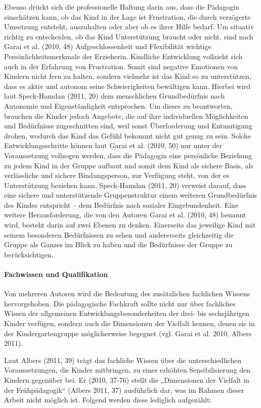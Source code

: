 Ebenso drückt sich die professionelle Haltung darin aus, dass die Pädagogin einschätzen kann, ob das Kind in der Lage ist Frustration, die durch verzögerte Umsetzung entsteht, auszuhalten oder aber ob es ihrer Hilfe bedarf. Um situativ richtig zu entscheiden, ob das Kind Unterstützung braucht oder nicht, sind nach Garai et al. (2010, 48) Aufgeschlossenheit und Flexibilität wichtige Persönlichkeitsmerkmale der Erzieherin. Kindliche Entwicklung vollzieht sich auch in der Erfahrung von Frustration. Somit sind negative Emotionen von Kindern nicht fern zu halten, sondern vielmehr ist das Kind so zu unterstützen, dass es aktiv und autonom seine Schwierigkeiten bewältigen kann.
Hierbei wird laut Speck-Hamdan (2011, 20) dem menschlichen Grundbedürfnis nach Autonomie und Eigenständigkeit entsprochen. Um dieses zu beantworten, brauchen die Kinder jedoch Angebote, die auf ihre individuellen Möglichkeiten und Bedürfnisse zugeschnitten sind, weil sonst Überforderung und Entmutigung drohen, wodurch das Kind das Gefühl bekommt nicht gut genug zu sein. Solche Entwicklungsschritte können laut Garai et al. (2010, 50) nur unter der Voraussetzung vollzogen werden, dass die Pädagogin eine persönliche Beziehung zu jedem Kind in der Gruppe aufbaut und somit dem Kind als sichere Basis, als verlässliche und sichere Bindungsperson, zur Verfügung steht, von der es Unterstützung beziehen kann. Speck-Hamdan (2011, 20) verweist darauf, dass eine sichere und unterstützende Gruppenstruktur einem weiteren Grundbedürfnis des Kindes entspricht -- dem Bedürfnis nach sozialer Eingebundenheit. 
Eine weitere Herausforderung, die von den Autoren Garai et al. (2010, 48) benannt wird, besteht darin auf zwei Ebenen zu denken. Einerseits das jeweilige Kind mit seinem besonderen Bedürfnissen zu sehen und andererseits gleichzeitig die Gruppe als Ganzes im Blick zu haben und die Bedürfnisse der Gruppe zu berücksichtigen.  

\paragraph{Fachwissen und Qualifikation}
Von mehreren Autoren wird die Bedeutung des zusätzlichen fachlichen Wissens hervorgehoben. Die pädagogische Fachkraft sollte nicht nur über fachliches Wissen der allgemeinen Entwicklungsbesonderheiten der drei- bis sechs\-jährigen Kinder verfügen, sondern auch die Dimensionen der Vielfalt kennen, denen sie in der Kindergartengruppe möglicherweise begegnet (vgl. Garai et al. 2010, Albers 2011). 

Laut Albers (2011, 39) trägt das fachliche Wissen über die unterschiedlichen Voraussetzungen, die Kinder mitbringen, zu einer erhöhten Sensibilisierung den Kindern gegenüber bei. Er (2010, 37-76) stellt die „Dimensionen der Vielfalt in der Frühpädagogik“ (Albers 2011, 37) ausführlich dar, was im Rahmen dieser Arbeit nicht möglich ist. Folgend werden diese lediglich aufgezählt: 

